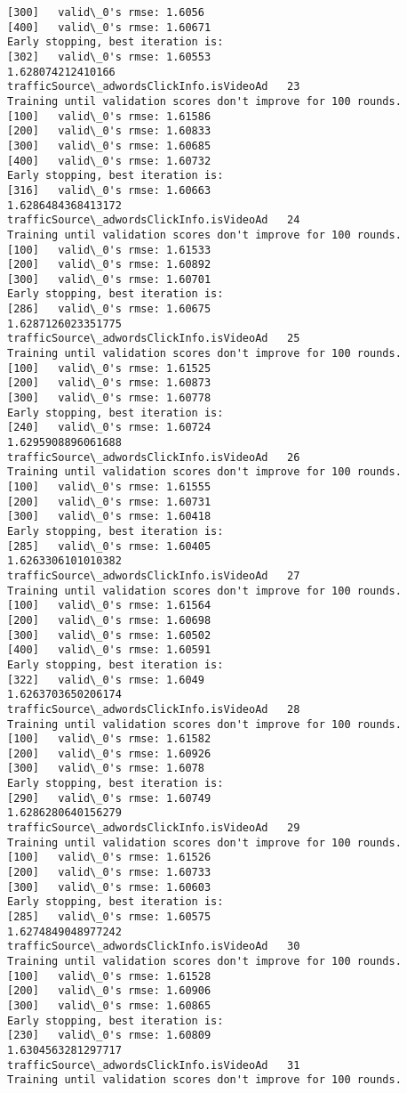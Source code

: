 \documentclass[11pt]{article}
\begin{document}
\begin{Verbatim}[commandchars=\\\{\}]
[300]	valid\_0's rmse: 1.6056
[400]	valid\_0's rmse: 1.60671
Early stopping, best iteration is:
[302]	valid\_0's rmse: 1.60553
1.628074212410166
trafficSource\_adwordsClickInfo.isVideoAd   23
Training until validation scores don't improve for 100 rounds.
[100]	valid\_0's rmse: 1.61586
[200]	valid\_0's rmse: 1.60833
[300]	valid\_0's rmse: 1.60685
[400]	valid\_0's rmse: 1.60732
Early stopping, best iteration is:
[316]	valid\_0's rmse: 1.60663
1.6286484368413172
trafficSource\_adwordsClickInfo.isVideoAd   24
Training until validation scores don't improve for 100 rounds.
[100]	valid\_0's rmse: 1.61533
[200]	valid\_0's rmse: 1.60892
[300]	valid\_0's rmse: 1.60701
Early stopping, best iteration is:
[286]	valid\_0's rmse: 1.60675
1.6287126023351775
trafficSource\_adwordsClickInfo.isVideoAd   25
Training until validation scores don't improve for 100 rounds.
[100]	valid\_0's rmse: 1.61525
[200]	valid\_0's rmse: 1.60873
[300]	valid\_0's rmse: 1.60778
Early stopping, best iteration is:
[240]	valid\_0's rmse: 1.60724
1.6295908896061688
trafficSource\_adwordsClickInfo.isVideoAd   26
Training until validation scores don't improve for 100 rounds.
[100]	valid\_0's rmse: 1.61555
[200]	valid\_0's rmse: 1.60731
[300]	valid\_0's rmse: 1.60418
Early stopping, best iteration is:
[285]	valid\_0's rmse: 1.60405
1.6263306101010382
trafficSource\_adwordsClickInfo.isVideoAd   27
Training until validation scores don't improve for 100 rounds.
[100]	valid\_0's rmse: 1.61564
[200]	valid\_0's rmse: 1.60698
[300]	valid\_0's rmse: 1.60502
[400]	valid\_0's rmse: 1.60591
Early stopping, best iteration is:
[322]	valid\_0's rmse: 1.6049
1.6263703650206174
trafficSource\_adwordsClickInfo.isVideoAd   28
Training until validation scores don't improve for 100 rounds.
[100]	valid\_0's rmse: 1.61582
[200]	valid\_0's rmse: 1.60926
[300]	valid\_0's rmse: 1.6078
Early stopping, best iteration is:
[290]	valid\_0's rmse: 1.60749
1.6286280640156279
trafficSource\_adwordsClickInfo.isVideoAd   29
Training until validation scores don't improve for 100 rounds.
[100]	valid\_0's rmse: 1.61526
[200]	valid\_0's rmse: 1.60733
[300]	valid\_0's rmse: 1.60603
Early stopping, best iteration is:
[285]	valid\_0's rmse: 1.60575
1.6274849048977242
trafficSource\_adwordsClickInfo.isVideoAd   30
Training until validation scores don't improve for 100 rounds.
[100]	valid\_0's rmse: 1.61528
[200]	valid\_0's rmse: 1.60906
[300]	valid\_0's rmse: 1.60865
Early stopping, best iteration is:
[230]	valid\_0's rmse: 1.60809
1.6304563281297717
trafficSource\_adwordsClickInfo.isVideoAd   31
Training until validation scores don't improve for 100 rounds.

\end{Verbatim}
\end{document}
